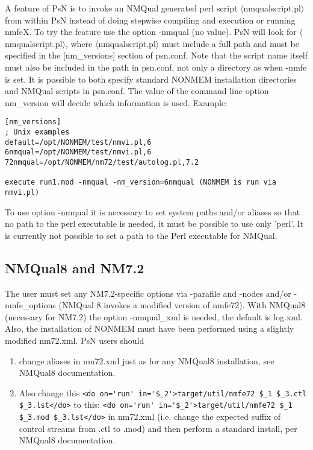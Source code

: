 A feature of PsN is to invoke an NMQual generated perl script $\langle$nmqualscript.pl$\rangle$ from within PsN instead of doing stepwise compiling and execution or running nmfeX. To try the feature use the option -nmqual (no value). PsN will look for $\langle$nmqualscript.pl$\rangle$, where $\langle$nmqualscript.pl$\rangle$ must include a full path and must be specified in the [nm\_versions] section of psn.conf. Note that the script name itself must also be included in the path in psn.conf, not only a directory as when -nmfe is set. It is possible to both specify standard NONMEM installation directories and NMQual scripts in psn.conf. The value of the command line option nm\_version will decide which information is used. Example:
\begin{verbatim}
[nm_versions]
; Unix examples
default=/opt/NONMEM/test/nmvi.pl,6
6nmqual=/opt/NONMEM/test/nmvi.pl,6
72nmqual=/opt/NONMEM/nm72/test/autolog.pl,7.2

execute run1.mod -nmqual -nm_version=6nmqual (NONMEM is run via nmvi.pl)
\end{verbatim}
To use option -nmqual it is necessary to set system paths and/or aliases so that no path to the perl executable is needed, it must be possible to use only 'perl'. It is currently not possible to set a path to the Perl executable for NMQual.

\subsection{NMQual8 and NM7.2}
The user must set any NM7.2-specific options via -parafile and -nodes and/or -nmfe\_options (NMQual 8 invokes a modified version of nmfe72). With NMQual8 (necessary for NM7.2) the option -nmqual\_xml is needed, the default is log.xml.  Also, the installation of NONMEM must have been performed using a slightly modified nm72.xml. PsN users should

\begin{enumerate}
	\item change aliases in nm72.xml just as for any NMQual8 installation, see NMQual8 documentation.
	\item Also change this
\verb|<do on='run' in='$_2'>target/util/nmfe72 $_1 $_3.ctl $_3.lst</do>|
to this:
\verb|<do on='run' in='$_2'>target/util/nmfe72 $_1 $_3.mod $_3.lst</do>|
in nm72.xml (i.e. change the expected suffix of control streams from .ctl to .mod) and then perform a standard install, per NMQual8 documentation.
\end{enumerate}

